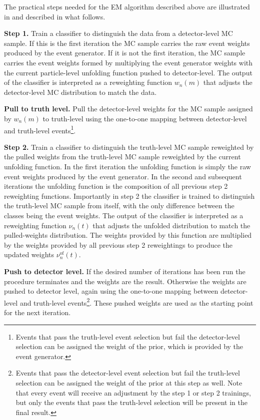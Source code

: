 The practical steps needed for the EM algorithm described above are illustrated in  and described in what follows.

\textbf{Step 1.}
Train a classifier to distinguish the data from a detector-level MC sample.
If this is the first iteration the MC sample carries the raw event weights produced by the event generator.
If it is not the first iteration, the MC sample carries the event weights formed by multiplying the event generator weights with the current particle-level unfolding function pushed to detector-level.
The output of the classifier is interpreted as a reweighting function $w_n(m)$ that adjusts the detector-level MC distribution to match the data.

\textbf{Pull to truth level.}
Pull the detector-level weights for the MC sample assigned by $w_n(m)$ to truth-level using the one-to-one mapping between detector-level and truth-level events\footnote{Events that pass the truth-level event selection but fail the detector-level selection can be assigned the weight of the prior, which is provided by the event generator.}.

\textbf{Step 2.}
Train a classifier to distinguish the truth-level MC sample reweighted by the pulled weights from the truth-level MC sample reweighted by the current unfolding function.
In the first iteration the unfolding function is simply the raw event weights produced by the event generator.
In the second and subsequent iterations the unfolding function is the composition of all previous step 2 reweighting functions.
Importantly in step 2 the classifier is trained to distinguish the truth-level MC sample from itself, with the only difference between the classes being the event weights.
The output of the classifier is interpreted as a reweighting function $\nu_n(t)$ that adjusts the unfolded distribution to match the pulled-weights distribution.
The weights provided by this function are multiplied by the weights provided by all previous step 2 reweightings to produce the updated \Omnifold weights $\nu^{\mathrm{of}}_n(t)$.

\textbf{Push to detector level.}
If the desired number of iterations has been run the procedure terminates and the \Omnifold weights are the result.
Otherwise the \Omnifold weights are pushed to detector level, again using the one-to-one mapping between detector-level and truth-level events\footnote{Events that pass the detector-level event selection but fail the truth-level selection can be assigned the weight of the prior at this step as well. Note that every event will receive an adjustment by the step 1 or step 2 trainings, but only the events that pass the truth-level selection will be present in the final result.}.
These pushed weights are used as the starting point for the next iteration.

